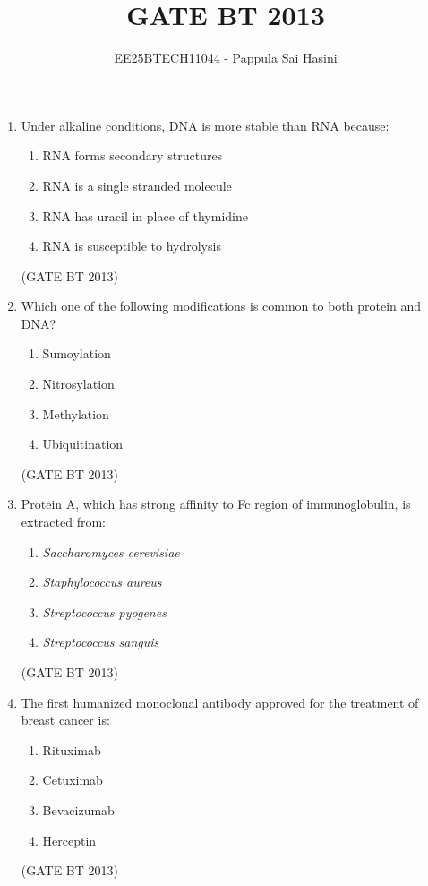 \documentclass[journal,12pt,onecolumn]{IEEEtran}
\theoremstyle{remark}
\begin{document}
\title{GATE BT 2013}
\author{EE25BTECH11044 - Pappula Sai Hasini}
\maketitle
\renewcommand{\thefigure}{\theenumi}
\renewcommand{\thetable}{\theenumi}
\begin{enumerate}
    \item 


Under alkaline conditions, DNA is more stable than RNA because:

\begin{enumerate}
    \item RNA forms secondary structures
    \item RNA is a single stranded molecule
    \item RNA has uracil in place of thymidine
    \item RNA is susceptible to hydrolysis
\end{enumerate} 
\hfill (GATE BT 2013)

\item Which one of the following modifications is common to both protein and DNA?

\begin{enumerate}
    \item Sumoylation
    \item Nitrosylation
    \item Methylation
    \item Ubiquitination
\end{enumerate} 
\hfill (GATE BT 2013)

\item Protein A, which has strong affinity to Fc region of immunoglobulin, is extracted from:

\begin{enumerate}
    \item \textit{Saccharomyces cerevisiae}
    \item \textit{Staphylococcus aureus}
    \item \textit{Streptococcus pyogenes}
    \item \textit{Streptococcus sanguis}
\end{enumerate}
\hfill (GATE BT 2013)

\item The first humanized monoclonal antibody approved for the treatment of breast cancer is:

\begin{enumerate}
    \item Rituximab
    \item Cetuximab
    \item Bevacizumab
    \item Herceptin
\end{enumerate} 
\hfill (GATE BT 2013)


\end{enumerate}
\end{document}

